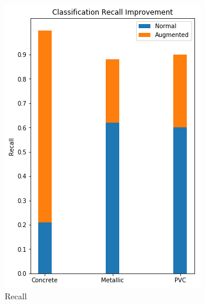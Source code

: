 \begin{figure}[H]
\begin{subfigure}[b]{0.4\linewidth}
    \includegraphics[width=\linewidth]{figures/Frequency-Recall.png}
    \caption{Recall}
  \end{subfigure}
  \begin{subfigure}[b]{0.4\linewidth}

\end{subfigure}
\end{figure}
